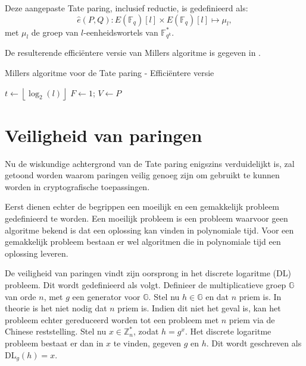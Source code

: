 Deze aangepaste Tate paring, inclusief reductie, is gedefinieerd als:
\[\hat{e}(P, Q): E(\mathbb{F}_q)[l] \times E(\mathbb{F}_q)[l] \mapsto \mu_l,\]
met $\mu_l$ de groep van $l$-eenheidswortels van $\mathbb{F}_{q^k}^*$.

De resulterende effici\"entere versie van Millers algoritme is gegeven in .

\begin{algorithm}[h]
	\caption[Millers algoritme voor de Tate paring - Effici\"entere versie]{Millers algoritme voor de Tate paring - Effici\"entere versie \cite{barreto-efficient}}
	\label{algoritme-paringen-miller-beter}
	$t \gets \left\lfloor \log _2 (l) \right\rfloor$\;
	$F \gets 1$; $V \gets P$\;	
\end{algorithm}

\section{Veiligheid van paringen}

Nu de wiskundige achtergrond van de Tate paring enigszins verduidelijkt is, zal getoond worden waarom paringen veilig genoeg zijn om gebruikt te kunnen worden in cryptografische toepassingen.

Eerst dienen echter de begrippen een moeilijk en een gemakkelijk probleem gedefinieerd te worden. Een moeilijk probleem is een probleem waarvoor geen algoritme bekend is dat een oplossing kan vinden in polynomiale tijd. Voor een gemakkelijk probleem bestaan er wel algoritmen die in polynomiale tijd een oplossing leveren.

De veiligheid van paringen vindt zijn oorsprong in het discrete logaritme (DL) probleem. Dit wordt gedefinieerd als volgt. Definieer de multiplicatieve groep $\mathbb{G}$ van orde $n$, met $g$ een generator voor $\mathbb{G}$. Stel nu $h \in \mathbb{G}$ en dat $n$ priem is. In theorie is het niet nodig dat $n$ priem is. Indien dit niet het geval is, kan het probleem echter gereduceerd worden tot een probleem met $n$ priem via de Chinese reststelling. Stel nu $x \in \mathbb{Z}_n^*$, zodat $h = g^x$. Het discrete logaritme probleem bestaat er dan in $x$ te vinden, gegeven $g$ en $h$. Dit wordt geschreven als DL$_g(h) = x$.

